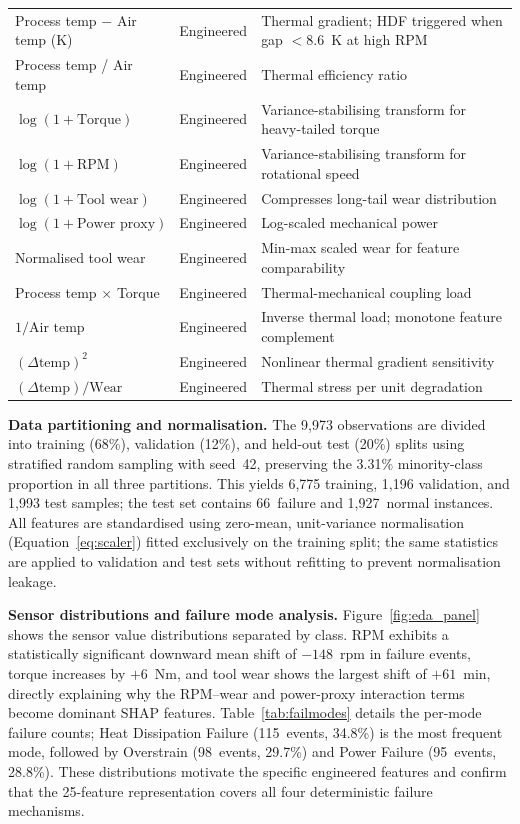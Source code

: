 \documentclass[sensors,article,submit,pdftex,moreauthors]{Definitions/mdpi}
\begin{document}
\begin{table}[H]
\begin{tabularx}{\textwidth}{llX}
Process temp $-$ Air temp (K)   & Engineered  & Thermal gradient; HDF triggered when gap $< 8.6$~K at high RPM \\
Process temp / Air temp         & Engineered  & Thermal efficiency ratio \\
$\log(1 + \text{Torque})$       & Engineered  & Variance-stabilising transform for heavy-tailed torque \\
$\log(1 + \text{RPM})$          & Engineered  & Variance-stabilising transform for rotational speed \\
$\log(1 + \text{Tool wear})$    & Engineered  & Compresses long-tail wear distribution \\
$\log(1 + \text{Power proxy})$  & Engineered  & Log-scaled mechanical power \\
Normalised tool wear            & Engineered  & Min-max scaled wear for feature comparability \\
Process temp $\times$ Torque    & Engineered  & Thermal-mechanical coupling load \\
$1 / \text{Air temp}$           & Engineered  & Inverse thermal load; monotone feature complement \\
$(\Delta\text{temp})^2$         & Engineered  & Nonlinear thermal gradient sensitivity \\
$(\Delta\text{temp}) / \text{Wear}$ & Engineered & Thermal stress per unit degradation \\
\bottomrule
\end{tabularx}
\end{table}

\textbf{Data partitioning and normalisation.}
The 9{,}973 observations are divided into training (68\%),
validation (12\%), and held-out test (20\%) splits using stratified
random sampling with seed~42, preserving the 3.31\% minority-class
proportion in all three partitions.
This yields 6{,}775 training, 1{,}196 validation, and 1{,}993 test
samples; the test set contains 66~failure and 1{,}927~normal
instances.
All features are standardised using zero-mean, unit-variance
normalisation (Equation~\ref{eq:scaler}) fitted exclusively on the
training split; the same statistics are applied to validation and
test sets without refitting to prevent normalisation leakage.

\textbf{Sensor distributions and failure mode analysis.}
Figure~\ref{fig:eda_panel} shows the sensor value distributions
separated by class.
RPM exhibits a statistically significant downward mean shift of
$-148$~rpm in failure events, torque increases by $+6$~Nm, and tool
wear shows the largest shift of $+61$~min, directly explaining why
the RPM--wear and power-proxy interaction terms become dominant SHAP
features.
Table~\ref{tab:failmodes} details the per-mode failure counts;
Heat Dissipation Failure (115~events, 34.8\%) is the most frequent
mode, followed by Overstrain (98~events, 29.7\%) and Power Failure
(95~events, 28.8\%).
These distributions motivate the specific engineered features and
confirm that the 25-feature representation covers all four
deterministic failure mechanisms.
\end{document}
